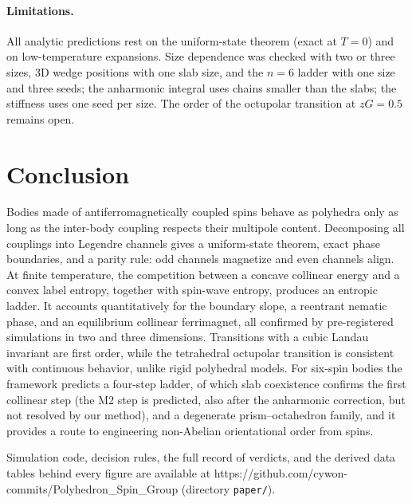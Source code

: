 \documentclass[pre,twocolumn,superscriptaddress,amsmath,amssymb,floatfix]{revtex4-2}
\begin{document}
\paragraph*{Limitations.} All analytic predictions rest on the uniform-state theorem (exact at $T=0$) and on low-temperature expansions. Size dependence was checked with two or three sizes, 3D wedge positions with one slab size, and the $n=6$ ladder with one size and three seeds; the anharmonic integral uses chains smaller than the slabs; the stiffness uses one seed per size. The order of the octupolar transition at $zG=0.5$ remains open.

\section{Conclusion}

Bodies made of antiferromagnetically coupled spins behave as polyhedra only as long as the inter-body coupling respects their multipole content. Decomposing all couplings into Legendre channels gives a uniform-state theorem, exact phase boundaries, and a parity rule: odd channels magnetize and even channels align. At finite temperature, the competition between a concave collinear energy and a convex label entropy, together with spin-wave entropy, produces an entropic ladder. It accounts quantitatively for the boundary slope, a reentrant nematic phase, and an equilibrium collinear ferrimagnet, all confirmed by pre-registered simulations in two and three dimensions. Transitions with a cubic Landau invariant are first order, while the tetrahedral octupolar transition is consistent with continuous behavior, unlike rigid polyhedral models. For six-spin bodies the framework predicts a four-step ladder, of which slab coexistence confirms the first collinear step (the M2 step is predicted, also after the anharmonic correction, but not resolved by our method), and a degenerate prism--octahedron family, and it provides a route to engineering non-Abelian orientational order from spins.

\begin{acknowledgments}
Simulation code, decision rules, the full record of verdicts, and the derived data tables behind every figure are available at https://github.com/cywon-commits/Polyhedron\_Spin\_Group (directory \texttt{paper/}).
\end{acknowledgments}
\end{document}
